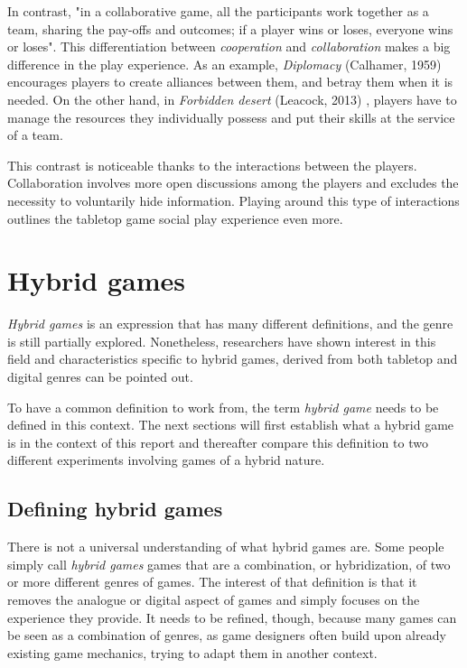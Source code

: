 In contrast, "in a collaborative game, all the participants work together as a team, sharing the pay-offs and outcomes; if a player wins or loses, everyone wins or loses"\cite{art:collab}. 
This differentiation between \textit{cooperation} and \textit{collaboration} makes a big difference in the play experience. As an example, \textit{Diplomacy} (Calhamer, 1959) \cite{game:diplo} encourages players to create alliances between them, and betray them when it is needed. On the other hand, in \textit{Forbidden desert} (Leacock, 2013) \cite{game:desert}, players have to manage the resources they individually possess and put their skills at the service of a team. 

This contrast is noticeable thanks to the interactions between the players. Collaboration involves more open discussions among the players and excludes the necessity to voluntarily hide information. Playing around this type of interactions outlines the tabletop game social play experience even more.

\section{Hybrid games}
\textit{Hybrid games} is an expression that has many different definitions, and the genre is still partially explored. Nonetheless, researchers have shown interest in this field and characteristics specific to hybrid games, derived from both tabletop and digital genres can be pointed out.

To have a common definition to work from, the term \textit{hybrid game} needs to be defined in this context. The next sections will first establish what a hybrid game is in the context of this report and thereafter compare this definition to two different experiments involving games of a hybrid nature.

\subsection{Defining hybrid games}
There is not a universal understanding of what hybrid games are. Some people simply call \textit{hybrid games} games that are a combination, or hybridization, of two or more different genres of games. The interest of that definition is that it removes the analogue or digital aspect of games and simply focuses on the experience they provide. It needs to be refined, though, because many games can be seen as a combination of genres, as game designers often build upon already existing game mechanics, trying to adapt them in another context. 

